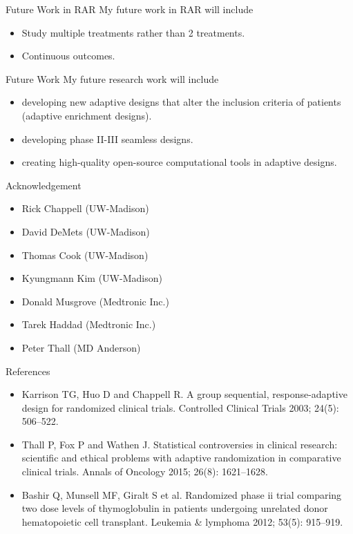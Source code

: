 \documentclass[12pt,t]{beamer}
\newcommand{\bi}{\begin{itemize}}
\newcommand{\ei}{\end{itemize}}
\begin{document}
\begin{frame}{Future Work in RAR}
My future work in RAR will include
\vspace{24pt}
\bi
\itemsep24pt
\item Study multiple treatments rather than 2 treatments.
\item Continuous outcomes.
\ei
\end{frame}


\begin{frame}{Future Work}
My future research work will include 
\bi
\itemsep24pt
\item developing new adaptive designs that alter the inclusion criteria of patients (adaptive enrichment designs).  
\item developing phase II-III seamless designs.
\item creating high-quality open-source computational tools in adaptive designs.
\ei
\end{frame}




\begin{frame}{Acknowledgement}
\bi
\itemsep6pt
\item Rick Chappell (UW-Madison)
\item David DeMets (UW-Madison)
\item Thomas Cook (UW-Madison)
\item Kyungmann Kim (UW-Madison)
\item Donald Musgrove (Medtronic Inc.)
\item Tarek Haddad (Medtronic Inc.)
\item Peter Thall (MD Anderson)
\ei
\end{frame}


\begin{frame}{References}
\bi
\itemsep12pt
\item Karrison TG, Huo D and Chappell R. A group sequential, response-adaptive design for randomized clinical trials. Controlled Clinical Trials 2003; 24(5): 506–522.

\item Thall P, Fox P and Wathen J. Statistical controversies in clinical research: scientific and ethical problems with adaptive randomization in comparative clinical trials. Annals of Oncology 2015; 26(8): 1621–1628.

\item Bashir Q, Munsell MF, Giralt S et al. Randomized phase ii trial comparing two dose levels of thymoglobulin in patients undergoing unrelated donor hematopoietic cell transplant. Leukemia \& lymphoma 2012; 53(5): 915–919.
\ei
\end{frame}
\end{document}
